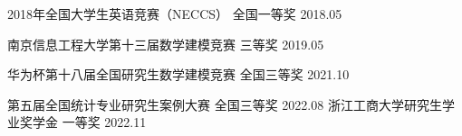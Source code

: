 



\begin{cvhonors}

  \cvhonor
    {2018年全国大学生英语竞赛（NECCS）} %
    {} %
    {全国一等奖} %
    {2018.05} %

  \cvhonor
    {南京信息工程大学第十三届数学建模竞赛} %
    {} %
    {三等奖} %
    {2019.05} %

\cvhonor
  {华为杯第十八届全国研究生数学建模竞赛} %
  {} %
  {全国三等奖} %
  {2021.10} %


  \cvhonor
    {第五届全国统计专业研究生案例大赛} %
    {} %
    {全国三等奖} %
    {2022.08} %
\cvhonor
  {浙江工商大学研究生学业奖学金} %
  {} %
  {一等奖} %
  {2022.11} %



\end{cvhonors}





